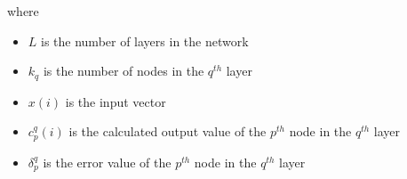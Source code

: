 where
\vspace{-1em}
\begin{itemize}
	\addtolength{\itemsep}{-1.5ex}
	\item $L$ is the number of layers in the network
	\item $k_q$ is the number of nodes in the $q^{th}$ layer
	\item $x(i)$ is the input vector
	\item $c^q_p(i)$ is the calculated output value of the $p^{th}$ node in the $q^{th}$ layer
	\item $\delta^q_p$ is the error value of the $p^{th}$ node in the $q^{th}$ layer
\end{itemize}
